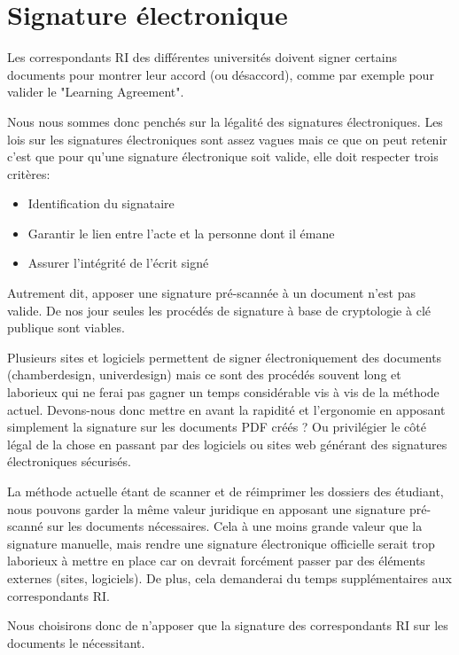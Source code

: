 \section{Signature électronique}
Les correspondants RI des différentes universités doivent signer certains documents pour montrer leur accord (ou désaccord), comme par exemple pour valider le "Learning Agreement".

Nous nous sommes donc penchés sur la légalité des signatures électroniques.
Les lois sur les signatures électroniques sont assez vagues mais ce que on peut retenir c'est que pour qu'une signature électronique soit valide, elle doit respecter trois critères:
\begin{itemize}
\item Identification du signataire
\item Garantir le lien entre l'acte et la personne dont il émane
\item Assurer l'intégrité de l'écrit signé
\end{itemize}
Autrement dit, apposer une signature pré-scannée à un document n'est pas valide.
De nos jour seules les procédés de signature à base de cryptologie à clé publique sont viables.

Plusieurs sites et logiciels permettent de signer électroniquement des documents (chamberdesign, univerdesign) mais ce sont des procédés souvent long et laborieux qui ne ferai pas gagner un temps considérable vis à vis de la méthode actuel.
Devons-nous donc mettre en avant la rapidité et l'ergonomie en apposant simplement la signature sur les documents PDF créés ? Ou privilégier le côté légal de la chose en passant par des logiciels ou sites web générant des signatures électroniques sécurisés.

La méthode actuelle étant de scanner et de réimprimer les dossiers des étudiant, nous pouvons garder la même valeur juridique en apposant une signature pré-scanné sur les documents nécessaires. Cela à une moins grande valeur que la signature manuelle, mais rendre une signature électronique officielle serait trop laborieux à mettre en place car on devrait forcément passer par des éléments externes (sites, logiciels). De plus, cela demanderai du temps supplémentaires aux correspondants RI.

Nous choisirons donc de n'apposer que la signature des correspondants RI sur les documents le nécessitant.
